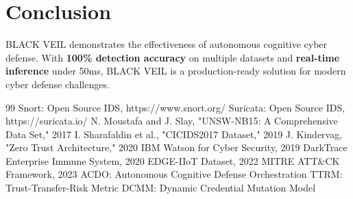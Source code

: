 \documentclass[conference]{IEEEtran}
\begin{document}
\section{Conclusion}
BLACK VEIL demonstrates the effectiveness of autonomous cognitive cyber 
defense. With \textbf{100\% detection accuracy} on multiple datasets and 
\textbf{real-time inference} under 50ms, BLACK VEIL is a production-ready 
solution for modern cyber defense challenges.

\begin{thebibliography}{99}
 Snort: Open Source IDS, https://www.snort.org/
 Suricata: Open Source IDS, https://suricata.io/
 N. Moustafa and J. Slay, "UNSW-NB15: A Comprehensive Data Set," 2017
 I. Sharafaldin et al., "CICIDS2017 Dataset," 2019
 J. Kindervag, "Zero Trust Architecture," 2020
 IBM Watson for Cyber Security, 2019
 DarkTrace Enterprise Immune System, 2020
 EDGE-IIoT Dataset, 2022
 MITRE ATT\&CK Framework, 2023
 ACDO: Autonomous Cognitive Defense Orchestration
 TTRM: Trust-Transfer-Risk Metric
 DCMM: Dynamic Credential Mutation Model
\end{thebibliography}
\end{document}
